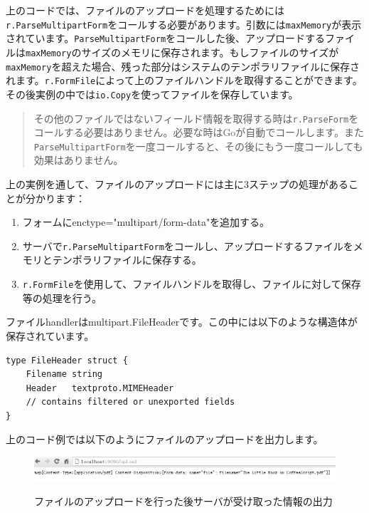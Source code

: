 上のコードでは、ファイルのアップロードを処理するためには\texttt{r.ParseMultipartForm}をコールする必要があります。引数には\texttt{maxMemory}が表示されています。\texttt{ParseMultipartForm}をコールした後、アップロードするファイルは\texttt{maxMemory}のサイズのメモリに保存されます。もしファイルのサイズが\texttt{maxMemory}を超えた場合、残った部分はシステムのテンポラリファイルに保存されます。\texttt{r.FormFile}によって上のファイルハンドルを取得することができます。その後実例の中では\texttt{io.Copy}を使ってファイルを保存しています。

\begin{quote}
その他のファイルではないフィールド情報を取得する時は\texttt{r.ParseForm}をコールする必要はありません。必要な時はGoが自動でコールします。また\texttt{ParseMultipartForm}を一度コールすると、その後にもう一度コールしても効果はありません。
\end{quote}

上の実例を通して、ファイルのアップロードには主に3ステップの処理があることが分かります：

\begin{enumerate}
  \item フォームにenctype="multipart/form-data"を追加する。
  \item サーバで\texttt{r.ParseMultipartForm}をコールし、アップロードするファイルをメモリとテンポラリファイルに保存する。
  \item \texttt{r.FormFile}を使用して、ファイルハンドルを取得し、ファイルに対して保存等の処理を行う。
\end{enumerate}

ファイルhandlerはmultipart.FileHeaderです。この中には以下のような構造体が保存されています。

\begin{lstlisting}[numbers=none]
type FileHeader struct {
    Filename string
    Header   textproto.MIMEHeader
    // contains filtered or unexported fields
}
\end{lstlisting}

上のコード例では以下のようにファイルのアップロードを出力します。

\begin{figure}[H]
  \includegraphics[width=14cm]{4.5.upload2.png}
   \label{図4.5}
   \caption{ファイルのアップロードを行った後サーバが受け取った情報の出力}
\end{figure}
